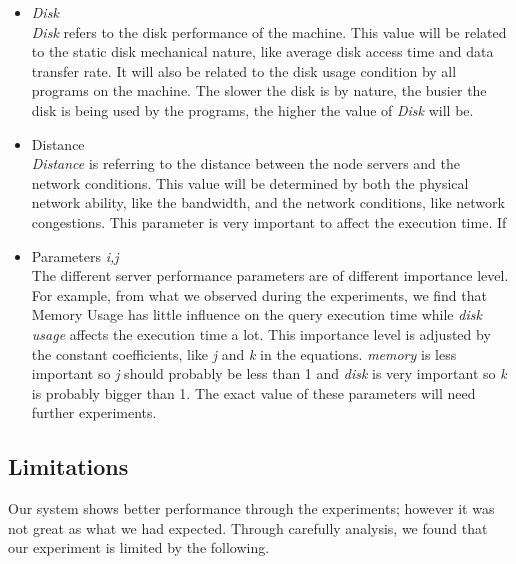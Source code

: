 \begin{itemize}
\item{\textit{Disk}}\\
\textit{Disk} refers to the disk performance of the machine. This value will be related to the static disk mechanical nature, like average disk access time and data transfer rate. It will also be related to the disk usage condition by all programs on the machine. The slower the disk is by nature, the busier the disk is being used by the programs, the higher the value of \textit{Disk} will be. 
\item{Distance}\\
\textit{Distance} is referring to the distance between the node servers and the network conditions. This value will be determined by both the physical network ability, like the bandwidth, and the network conditions, like network congestions. This parameter is very important to affect the execution time. If  
\item{Parameters \textit{i,j}}\\
The different server performance parameters are of different importance level. For example, from what we observed during the experiments, we find that Memory Usage has little influence on the query execution time while \textit{disk usage} affects the execution time a lot. This importance level is adjusted by the constant coefficients, like \textit{j} and \textit{k} in the equations. \textit{memory} is less important so \textit{j} should probably be less than 1 and \textit{disk} is very important so \textit{k} is probably bigger than 1. The exact value of these parameters will need further experiments. 

\end{itemize}

\subsection{Limitations}
    	Our system shows better performance through the experiments; however it was not great as what we had expected. Through carefully analysis, we found that our experiment is limited by the following.


